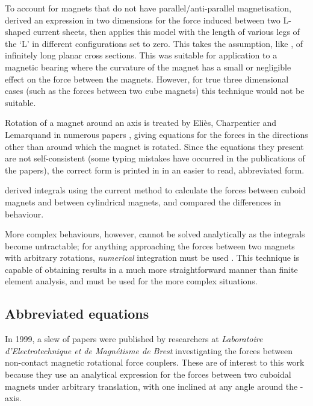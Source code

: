 To account for magnets that do not have parallel/anti-parallel
magnetisation, \textcite{chen2002,chen2003} derived an expression in two
dimensions for the force induced between two L-shaped current
sheets, then applies this model with the length
of various legs of the `L' in different configurations set to zero. This
takes the assumption, like \textcite{yonnet1981}, of infinitely long
planar cross sections.
This was suitable for application to a magnetic bearing where
the curvature of the magnet has a small or negligible effect on the
force between the magnets. However, for true three dimensional cases
(such as the forces between two cube magnets) this technique would not
be suitable.

Rotation of a magnet around an axis is treated by Eliès, Charpentier and
Lemarquand in numerous papers
\cite{elies1998,charpentier1999,charpentier1999a,elies1999a}, giving equations
for the forces in the directions other than around which the magnet is
rotated. Since the equations they present are not self-consistent (some typing
mistakes have occurred in the publications of the papers), the correct form is
printed in  in an easier to read, abbreviated form.

\textcite{nagaraj1988} derived integrals using the current method
 to calculate the forces between cuboid magnets and
between cylindrical magnets, and compared the differences in
behaviour.

More complex behaviours, however, cannot be solved analytically as the
integrals become untractable; for anything approaching the forces
between two magnets with arbitrary rotations, \emph{numerical}
integration must be used \cite{elies1999a}. This technique is capable
of obtaining results in a much more straightforward manner than finite
element analysis, and must be used for the more complex situations.

\subsection{Abbreviated equations}

In 1999, a slew of papers were published by researchers at \emph{Laboratoire
d'Electrotechnique et de Magnétisme de Brest} investigating the forces between
non-contact magnetic rotational force couplers. These are of interest to this
work because they use an analytical expression for the forces between two
cuboidal magnets under arbitrary translation, with one inclined at any angle
around the \x-axis.

